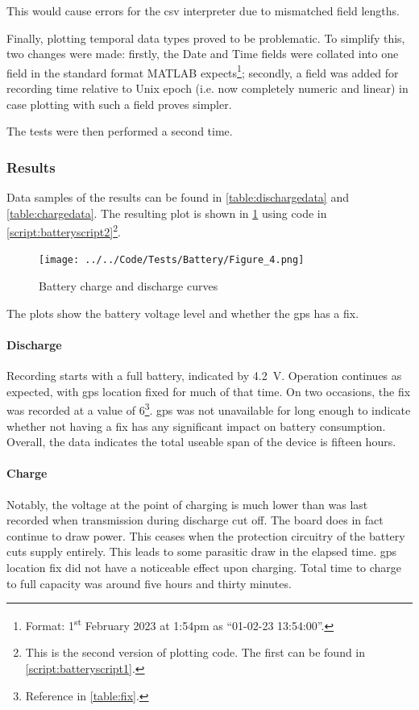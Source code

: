 This would cause errors for the \acrshort{csv} interpreter due to mismatched
field lengths.

Finally, plotting temporal data types proved to be problematic.
To simplify this, two changes were made: firstly, the Date and Time fields
were collated into one field in the standard format MATLAB expects\footnote{
    Format: 1\textsuperscript{st} February 2023 at 1:54pm as ``01-02-23 13:54:00''.
}; secondly, a field was added for recording time relative to Unix epoch
(i.e. now completely numeric and linear) in case plotting with such a field
proves simpler.

The tests were then performed a second time.

\subsubsection{Results}
Data samples of the results can be found in \cref{table:dischargedata} and \cref{table:chargedata}.
The resulting plot is shown in \cref{fig:batteryplot} using code in \cref{script:batteryscript2}\footnote{
    This is the second version of plotting code. The first can be found in \cref{script:batteryscript1}.
}.

\begin{figure}[H]
    \centering
    \texttt{[image: ../../Code/Tests/Battery/Figure\_4.png]}
    \caption{Battery charge and discharge curves}
    \label{fig:batteryplot}
\end{figure}

The plots show the battery voltage level and whether the \acrshort{gps} has a fix.

\paragraph{Discharge}
Recording starts with a full battery, indicated by \qty{4.2}{\V}. Operation
continues as expected, with \acrshort{gps} location fixed for much of that time.
On two occasions, the fix was recorded at a value of 6\footnote{
    Reference in \cref{table:fix}.
}.
\acrshort{gps} was not unavailable for long enough to indicate whether not having a fix
has any significant impact on battery consumption.
Overall, the data indicates the total useable span of the device is fifteen hours.

\paragraph{Charge}
Notably, the voltage at the point of charging is much lower than was last recorded
when transmission during discharge cut off. The board does in fact continue to draw power.
This ceases when the protection circuitry of the battery cuts supply entirely. This leads to
some parasitic draw in the elapsed time. \acrshort{gps} location fix did not have a
noticeable effect upon charging. Total time to charge to full capacity was around
five hours and thirty minutes.


